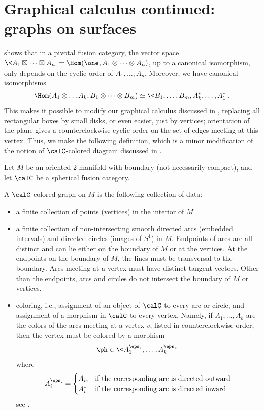 \section{Graphical calculus continued: graphs on surfaces}\label{s:graphical2}

 shows that in a pivotal fusion category, the vector
space $\< A_1\boxtimes\dots\boxtimes A_n\>=\Hom(\one, A_1\otimes\dots\otimes
A_n)$, up to a canonical isomorphism, only depends on the cyclic order of $A_1,
\dots, A_n$. Moreover, we have canonical isomorphisms
$$
   \Hom(A_1\otimes \dots A_k, B_1\otimes\dots\otimes B_m)\simeq
   \<B_1, \dots, B_m,
  A_k^*,\dots, A_1^*\>.
$$
This makes it possible to modify our graphical calculus discussed in
, replacing all rectangular boxes by small disks, or even
easier, just by vertices; orientation of the plane gives a counterclockwise
cyclic order on the set of edges meeting at this vertex. Thus, we make the
following definition, which is a minor modification of the notion of
$\calC$-colored diagram discussed in .
\begin{definition}\label{d:colored-graph}
  Let $M$ be an oriented 2-manifold with boundary (not necessarily compact), and
  let $\calC$ be a spherical fusion category.

  A $\calC$-colored graph on $M$ is the following collection of data:
  \begin{itemize}
    \item a finite collection of points (vertices) in the interior of $M$

    \item a finite collection of non-intersecting smooth directed arcs (embedded
    intervals) and directed circles (images of $S^1$) in $M$. Endpoints of arcs
    are all distinct and can lie either on the boundary of $M$ or at the
    vertices. At the endpoints on the boundary of $M$, the lines must be
    transversal to the boundary. Arcs meeting at a vertex must have distinct
    tangent vectors. Other than the endpoints, arcs and circles do not intersect
    the boundary of $M$ or vertices.

    \item coloring, i.e., assignment of an object of $\calC$ to every arc or
    circle, and assignment of a morphism in $\calC$ to every vertex. Namely, if
    $A_1, \dots, A_k$ are the colors of the arcs meeting at a vertex $v$, listed
    in counterclockwise order, then the vertex must be colored by a morphism
    $$
      \ph\in \<
        A_1^{\eps_1},\dots, A_k^{\eps_k}\>
    $$
    where
    \begin{equation}\label{e:signed-object2}
      A_i^{\eps_i} =\begin{cases}
                   A_i, & \text{if the corresponding arc is directed outward}\\
                   A_i^* &\text{if the corresponding arc is directed inward}
                   \end{cases}
    \end{equation}
    see .
  \end{itemize}


\end{definition}

